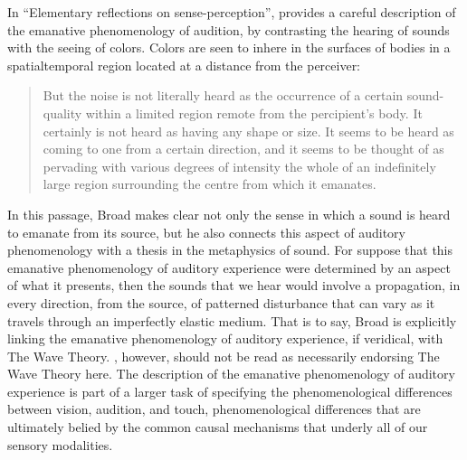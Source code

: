 In ``Elementary reflections on sense-perception'', \citet{Broad:1952kx} provides a careful description of the emanative phenomenology of audition, by contrasting the hearing of sounds with the seeing of colors. Colors are seen to inhere in the surfaces of bodies in a spatialtemporal region located at a distance from the perceiver:
\begin{quote}
	But the noise is not literally heard as the occurrence of a certain sound-quality within a limited region remote from the percipient's body. It certainly is not heard as having any shape or size. It seems to be heard as coming to one from a certain direction, and it seems to be thought of as pervading with various degrees of intensity the whole of an indefinitely large region surrounding the centre from which it emanates. \citep[5]{Broad:1952kx}
\end{quote}
In this passage, Broad makes clear not only the sense in which a sound is heard to emanate from its source, but he also connects this aspect of auditory phenomenology with a thesis in the metaphysics of sound. For suppose that this emanative phenomenology of auditory experience were determined by an aspect of what it presents, then the sounds that we hear would involve a propagation, in every direction, from the source, of patterned disturbance that can vary as it travels through an imperfectly elastic medium. That is to say, Broad is explicitly linking the emanative phenomenology of auditory experience, if veridical, with The Wave Theory. \citet{Broad:1952kx}, however, should not be read as necessarily endorsing The Wave Theory here. The description of the emanative phenomenology of auditory experience is part of a larger task of specifying the phenomenological differences between vision, audition, and touch, phenomenological differences that are ultimately belied by the common causal mechanisms that underly all of our sensory modalities.

